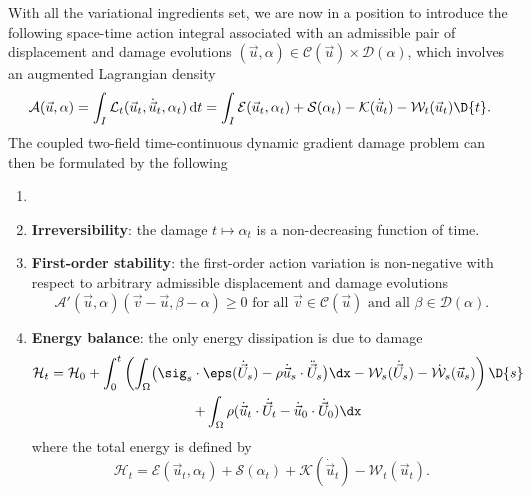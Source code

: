 With all the variational ingredients set, we are now in a position to introduce the following space-time action integral associated with an admissible pair of displacement and damage evolutions $(\vec{u},\alpha)\in\mathcal{C}(\vec{u})\times\mathcal{D}(\alpha)$, which involves an augmented Lagrangian density
\begin{equation} \label{eq:actionG}
\mathcal{A}(\vec{u},\alpha)=\int_I\mathcal{L}_t(\vec{u}_t,\dot{\vec{u}}_t,\alpha_t)\,\mathrm{d}t=\int_I\mathcal{E}(\vec{u}_t,\alpha_t)+\mathcal{S}(\alpha_t)-\mathcal{K}(\dot{\vec{u}}_t)-\mathcal{W}_t(\vec{u}_t)\D{t}.
\end{equation}
The coupled two-field time-continuous dynamic gradient damage problem can then be formulated by the following
\begin{definition} \label{def:dynagraddama}
\begin{enumerate}
\item[]
\item \textbf{Irreversibility}: the damage $t\mapsto\alpha_t$ is a non-decreasing function of time.
\item \textbf{First-order stability}: the first-order action variation is non-negative with respect to arbitrary admissible displacement and damage evolutions
\begin{equation} \label{eq:vi}
\mathcal{A}'(\vec{u},\alpha)(\vec{v}-\vec{u},\beta-\alpha)\geq 0\text{ for all $\vec{v}\in\mathcal{C}(\vec{u})$ and all $\beta\in\mathcal{D}(\alpha)$}.
\end{equation}
\item \textbf{Energy balance}: the only energy dissipation is due to damage
\begin{multline} \label{eq:dyngdeb}
\mathcal{H}_t=\mathcal{H}_0+\int_0^t\left(\int_\Omega\bigl(\sig_s\cdot\eps(\dot{\vec{U}}_s)-\rho\dot{\vec{u}}_s\cdot\ddot{\vec{U}}_s\bigr)\dx-\mathcal{W}_s(\dot{\vec{U}}_s)-\dot{\mathcal{W}}_s(\vec{u}_s)\right)\D{s} \\
+\int_\Omega\rho(\dot{\vec{u}}_t\cdot\dot{\vec{U}}_t-\dot{\vec{u}}_0\cdot\dot{\vec{U}}_0)\dx
\end{multline}
where the total energy is defined by
\[
\mathcal{H}_t=\mathcal{E}(\vec{u}_t,\alpha_t)+\mathcal{S}(\alpha_t)+\mathcal{K}(\dot{\vec{u}}_t)-\mathcal{W}_t(\vec{u}_t).
\]
\end{enumerate}
\end{definition}

